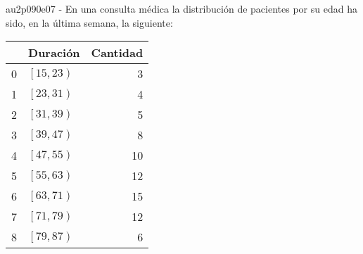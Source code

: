 \documentclass[spanish, 11pt]{exam}
\begin{document}
\begin{questions}
\begin{multicols}{1}
\begin{parts}
        \end{parts}
        \end{multicols}
        \question au2p090e07 - En una consulta médica la distribución de pacientes por su edad ha sido, en la última semana, la siguiente:\\\begin{tabular}{rlr}
\hline
    & Duración              &   Cantidad \\
\hline
  0 & $\left[15, 23\right)$ &          3 \\
  1 & $\left[23, 31\right)$ &          4 \\
  2 & $\left[31, 39\right)$ &          5 \\
  3 & $\left[39, 47\right)$ &          8 \\
  4 & $\left[47, 55\right)$ &         10 \\
  5 & $\left[55, 63\right)$ &         12 \\
  6 & $\left[63, 71\right)$ &         15 \\
  7 & $\left[71, 79\right)$ &         12 \\
  8 & $\left[79, 87\right)$ &          6 \\
\hline
\end{tabular}
        \begin{multicols}{1}
\end{multicols}
\end{questions}
\end{document}
